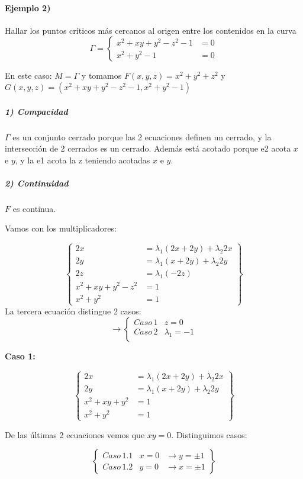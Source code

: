 \paragraph{Ejemplo 2)}

Hallar los puntos críticos más cercanos al origen entre los contenidos en la curva
\[\Gamma = \left\{ \begin{array}{cc} x^2+xy+y^2-z^2-1&=0\\x^2+y^2-1&=0\end{array}\right.\]

En este caso: $M = \Gamma$ y tomamos $F(x,y,z) = x^2+y^2+z^2$ y $G(x,y,z) = (x^2+xy+y^2-z^2-1,x^2+y^2-1)$

\subparagraph{1) Compacidad}

$\Gamma$ es un conjunto cerrado porque las 2 ecuaciones definen un cerrado, y la intersección de 2 cerrados es un cerrado. Además está acotado porque e2 acota $x$ e $y$, y la e1 acota la z teniendo acotadas $x$ e $y$.

\subparagraph{2) Continuidad}

$F$ es continua.


Vamos con los multiplicadores:

\[
\left\{
\begin{array}{cl}
2x &= \lambda_1(2x+2y)+ \lambda_2 2x\\
2y &= \lambda_1(x+2y) + \lambda_2 2y\\
2z &= \lambda_1(-2z)\\
x^2+xy+y^2-z^2& = 1\\
x^2+y^2 &= 1
\end{array}\right\}\]
La tercera ecuación distingue 2 casos:
\[
\rightarrow
\left\{\begin{array}{cl}
Caso\, 1 &z=0\\
Caso\, 2 &\lambda_1 = -1\\
\end{array}\right.\]

\textbf{Caso 1:}

\[\left\{
\begin{array}{cl}
2x &= \lambda_1(2x+2y) + \lambda_2 2x\\
2y &= \lambda_1(x+2y) + \lambda_2 2y\\
x^2+xy+y^2& = 1\\
x^2+y^2 &= 1
\end{array}\right\}\]

De las últimas 2 ecuaciones vemos que $xy=0$. Distinguimos casos:

\[\left\{\begin{array}{ccc}
Caso\, 1.1& x=0 &\rightarrow y = \pm 1\\
Caso\, 1.2& y=0 &\rightarrow x = \pm 1
\end{array}\right\}\]

